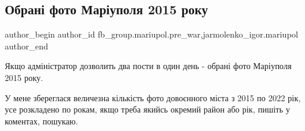  
 
 
 
 

\subsection{Обрані фото Маріуполя 2015 року}
\label{sec:11_01_2023.fb.fb_group.mariupol.pre_war.3.obran__foto_mar_upol}
 
\ifcmt
 author_begin
   author_id fb_group.mariupol.pre_war,jarmolenko_igor.mariupol
 author_end
\fi

Якщо адміністратор дозволить два пости в один день - обрані фото Маріуполя 2015
року. 

У мене збереглася величезна кількість фото довоєнного міста з 2015 по 2022 рік,
усе розкладено по рокам, якщо треба якийсь окремий район або рік, пишіть у
коментах, пошукаю.
